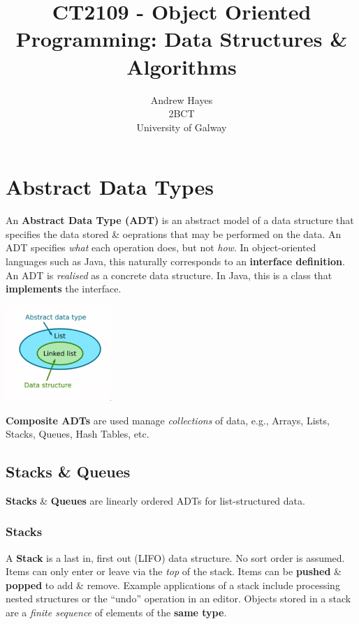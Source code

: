 \documentclass[11pt]{article}
\title{CT2109 - Object Oriented Programming: Data Structures \& Algorithms}
\author{Andrew Hayes\\
\AND
\AND
\AND
\AND
\AND
	2BCT\\
\AND
    University of Galway\\
}
\begin{document}
\maketitle

\newpage
\tableofcontents
\thispagestyle{empty}
\setcounter{page}{1}

\newpage
\section{Abstract Data Types}  
An \textbf{Abstract Data Type (ADT)} is an abstract model of a data structure that specifies the data stored \& oeprations that may be performed on the data. 
An ADT specifies \textit{what} each operation does, but not \textit{how}. 
In object-oriented languages such as Java, this naturally corresponds to an \textbf{interface definition}. 
An ADT is \textit{realised} as a concrete data structure. 
In Java, this is a class that \textbf{implements} the interface. 

\begin{center}
    \includegraphics[width=0.3\textwidth]{adt.png}
\end{center}

\textbf{Composite ADTs} are used manage \textit{collections} of data, e.g., Arrays, Lists, Stacks, Queues, Hash Tables, etc. 

\subsection{Stacks \& Queues}
\textbf{Stacks} \& \textbf{Queues} are linearly ordered ADTs for list-structured data. 

\subsubsection{Stacks}
A \textbf{Stack} is a last in, first out (LIFO) data structure. 
No sort order is assumed.
Items can only enter or leave via the \textit{top} of the stack. 
Items can be \textbf{pushed} \& \textbf{popped} to add \& remove. 
Example applications of a stack include processing nested structures or the ``undo'' operation in an editor.
Objects stored in a stack are a \textit{finite sequence} of elements of the \textbf{same type}. 
\end{document}

